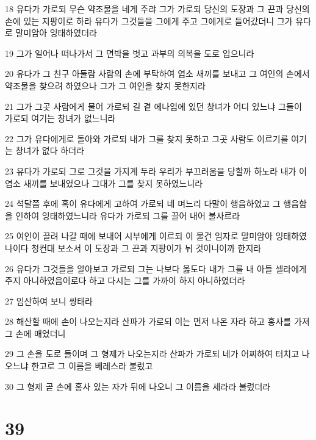 \par 18 유다가 가로되 무슨 약조물을 네게 주랴 그가 가로되 당신의 도장과 그 끈과 당신의 손에 있는 지팡이로 하라 유다가 그것들을 그에게 주고 그에게로 들어갔더니 그가 유다로 말미암아 잉태하였더라
\par 19 그가 일어나 떠나가서 그 면박을 벗고 과부의 의복을 도로 입으니라
\par 20 유다가 그 친구 아둘람 사람의 손에 부탁하여 염소 새끼를 보내고 그 여인의 손에서 약조물을 찾으려 하였으나 그가 그 여인을 찾지 못한지라
\par 21 그가 그곳 사람에게 물어 가로되 길 곁 에나임에 있던 창녀가 어디 있느냐 그들이 가로되 여기는 창녀가 없느니라
\par 22 그가 유다에게로 돌아와 가로되 내가 그를 찾지 못하고 그곳 사람도 이르기를 여기는 창녀가 없다 하더라
\par 23 유다가 가로되 그로 그것을 가지게 두라 우리가 부끄러움을 당할까 하노라 내가 이 염소 새끼를 보내었으나 그대가 그를 찾지 못하였느니라
\par 24 석달쯤 후에 혹이 유다에게 고하여 가로되 네 며느리 다말이 행음하였고 그 행음함을 인하여 잉태하였느니라 유다가 가로되 그를 끌어 내어 불사르라
\par 25 여인이 끌려 나갈 때에 보내어 시부에게 이르되 이 물건 임자로 말미암아 잉태하였나이다 청컨대 보소서 이 도장과 그 끈과 지팡이가 뉘 것이니이까 한지라
\par 26 유다가 그것들을 알아보고 가로되 그는 나보다 옳도다 내가 그를 내 아들 셀라에게 주지 아니하였음이로다 하고 다시는 그를 가까이 하지 아니하였더라
\par 27 임산하여 보니 쌍태라
\par 28 해산할 때에 손이 나오는지라 산파가 가로되 이는 먼저 나온 자라 하고 홍사를 가져 그 손에 매었더니
\par 29 그 손을 도로 들이며 그 형제가 나오는지라 산파가 가로되 네가 어찌하여 터치고 나오느냐 한고로 그 이름을 베레스라 불렀고
\par 30 그 형제 곧 손에 홍사 있는 자가 뒤에 나오니 그 이름을 세라라 불렀더라

\chapter{39}

